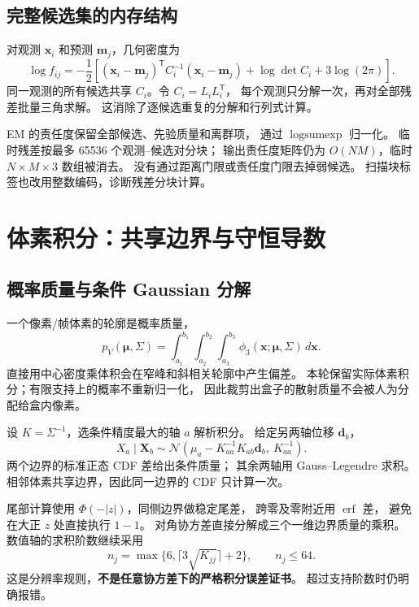 \documentclass[UTF8,11pt,a4paper,fontset=fandol]{ctexart}
\newcommand{\T}{^{\mathsf T}}
\begin{document}
\subsection{完整候选集的内存结构}

对观测 $\bm x_i$ 和预测 $\bm m_j$，几何密度为
\begin{equation}
\log f_{ij}=-\frac12\left[
(\bm x_i-\bm m_j)\T C_i^{-1}(\bm x_i-\bm m_j)
+\log\det C_i+3\log(2\pi)\right].
\end{equation}
同一观测的所有候选共享 $C_i$。令 $C_i=L_iL_i\T$，
每个观测只分解一次，再对全部残差批量三角求解。
这消除了逐候选重复的分解和行列式计算。

EM 的责任度保留全部候选、先验质量和离群项，
通过 $\operatorname{logsumexp}$ 归一化。
临时残差按最多 65536 个观测--候选对分块；
输出责任度矩阵仍为 $O(NM)$，临时 $N\times M\times3$ 数组被消去。
没有通过距离门限或责任度门限去掉弱候选。
扫描块标签也改用整数编码，诊断残差分块计算。

\section{体素积分：共享边界与守恒导数}

\subsection{概率质量与条件 Gaussian 分解}

一个像素/帧体素的轮廓是概率质量，
\begin{equation}
p_V(\bm\mu,\Sigma)=
\int_{a_1}^{b_1}\int_{a_2}^{b_2}\int_{a_3}^{b_3}
\phi_3(\bm x;\bm\mu,\Sigma)\,d\bm x .
\label{eq:voxel}
\end{equation}
直接用中心密度乘体积会在窄峰和斜相关轮廓中产生偏差。
本轮保留实际体素积分；有限支持上的概率不重新归一化，
因此裁剪出盒子的散射质量不会被人为分配给盒内像素。

设 $K=\Sigma^{-1}$，选条件精度最大的轴 $a$ 解析积分。
给定另两轴位移 $\bm d_b$，
\[
X_a\mid\bm X_b
\sim\mathcal N\left(\mu_a-K_{aa}^{-1}K_{ab}\bm d_b,\ K_{aa}^{-1}\right).
\]
两个边界的标准正态 CDF 差给出条件质量；
其余两轴用 Gauss--Legendre 求积。
相邻体素共享边界，因此同一边界的 CDF 只计算一次。

尾部计算使用 $\Phi(-|z|)$，同侧边界做稳定尾差，
跨零及零附近用 $\operatorname{erf}$ 差，
避免在大正 $z$ 处直接执行 $1-1$。
对角协方差直接分解成三个一维边界质量的乘积。
数值轴的求积阶数继续采用
\[
n_j=\max\{6,\lceil3\sqrt{K_{jj}}\rceil+2\},\qquad n_j\le64 .
\]
这是分辨率规则，\textbf{不是任意协方差下的严格积分误差证书}。
超过支持阶数时仍明确报错。
\end{document}
